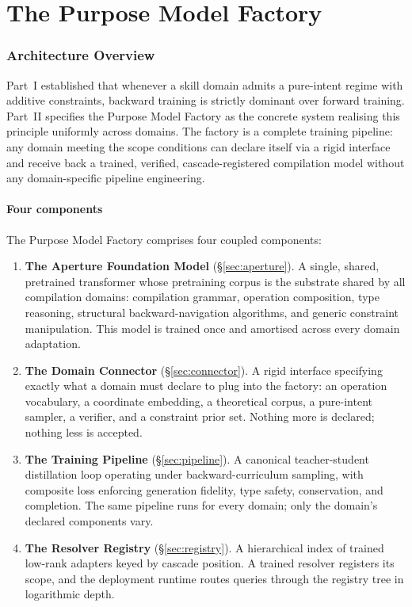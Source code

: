 \documentclass[twocolumn,11pt,a4paper]{article}
\begin{document}
\part{The Purpose Model Factory}
\label{part:factory}

\section{Architecture Overview}
\label{sec:architecture}

Part~I established that whenever a skill domain admits a pure-intent regime with additive constraints, backward training is strictly dominant over forward training. Part~II specifies the Purpose Model Factory as the concrete system realising this principle uniformly across domains. The factory is a complete training pipeline: any domain meeting the scope conditions can declare itself via a rigid interface and receive back a trained, verified, cascade-registered compilation model without any domain-specific pipeline engineering.

\subsection{Four components}

The Purpose Model Factory comprises four coupled components:

\begin{enumerate}[leftmargin=*,itemsep=3pt]
\item \textbf{The Aperture Foundation Model} (\S\ref{sec:aperture}). A single, shared, pretrained transformer whose pretraining corpus is the substrate shared by all compilation domains: compilation grammar, operation composition, type reasoning, structural backward-navigation algorithms, and generic constraint manipulation. This model is trained once and amortised across every domain adaptation.
\item \textbf{The Domain Connector} (\S\ref{sec:connector}). A rigid interface specifying exactly what a domain must declare to plug into the factory: an operation vocabulary, a coordinate embedding, a theoretical corpus, a pure-intent sampler, a verifier, and a constraint prior set. Nothing more is declared; nothing less is accepted.
\item \textbf{The Training Pipeline} (\S\ref{sec:pipeline}). A canonical teacher-student distillation loop operating under backward-curriculum sampling, with composite loss enforcing generation fidelity, type safety, conservation, and completion. The same pipeline runs for every domain; only the domain's declared components vary.
\item \textbf{The Resolver Registry} (\S\ref{sec:registry}). A hierarchical index of trained low-rank adapters keyed by cascade position. A trained resolver registers its scope, and the deployment runtime routes queries through the registry tree in logarithmic depth.
\end{enumerate}
\end{document}
